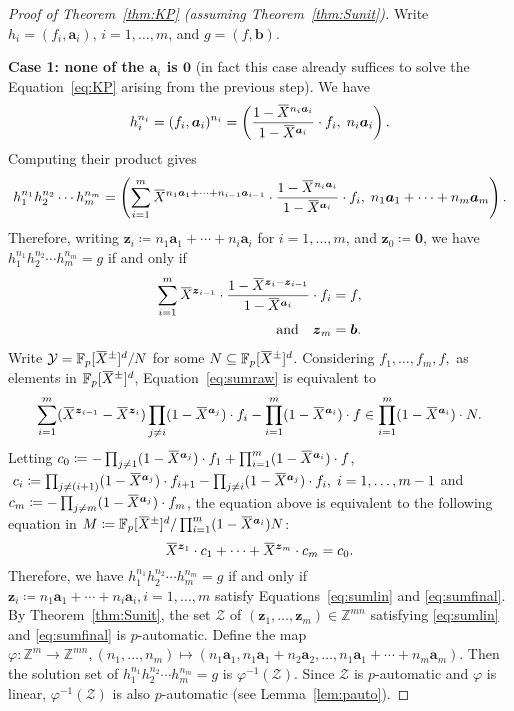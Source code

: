 \documentclass[a4paper,UKenglish,cleveref, autoref, thm-restate]{lipics-v2021}
\newcommand{\Z}{\mathbb{Z}}
\newcommand{\F}{\mathbb{F}}
\newcommand{\mY}{\mathcal{Y}}
\newcommand{\mZ}{\mathcal{Z}}
\newcommand{\ba}{\boldsymbol{a}}
\newcommand{\bb}{\boldsymbol{b}}
\newcommand{\bz}{\boldsymbol{z}}
\newcommand{\bzer}{\boldsymbol{0}}
\newcommand{\oX}{\mkern 1.5mu\overline{\mkern-1.5mu X \mkern-1.5mu}\mkern 1.5mu}
\theoremstyle{definition}
\theoremstyle{definition}
\theoremstyle{definition}
\begin{document}
\thmSunit*

\begin{proof}[Proof of Theorem~\ref{thm:KP} (assuming Theorem~\ref{thm:Sunit})]
    Write $h_i = (f_i, \ba_i), \, i = 1, \ldots, m$, and $g = (f, \bb)$.
    
    \textbf{Case 1: none of the $\ba_i$ is $\bzer$} (in fact this case already suffices to solve the Equation~\eqref{eq:KP} arising from the previous step).
    We have
    \[
    h_i^{n_i} = (f_i, \ba_i)^{n_i} = \left( \frac{1 - \oX^{n_i \ba_i}}{1 - \oX^{\ba_i}} \cdot f_i, \; n_i \ba_i \right).
    \]
    Computing their product gives
    \[
    h_1^{n_1} h_2^{n_2} \cdots h_m^{n_m} = \left( \sum_{i = 1}^m \oX^{n_1 \ba_1 + \cdots + n_{i-1} \ba_{i-1}} \cdot \frac{1 - \oX^{n_i \ba_i}}{1 - \oX^{\ba_i}} \cdot f_i,\; n_1 \ba_1 + \cdots + n_m \ba_m \right).
    \]
    Therefore, writing $\bz_i \coloneqq n_1 \ba_1 + \cdots + n_{i} \ba_{i}$ for $i = 1, \ldots, m$, and $\bz_0 \coloneqq \bzer$, we have $h_1^{n_1} h_2^{n_2} \cdots h_m^{n_m} = g$ if and only if
    \begin{align}
        \sum_{i = 1}^m \oX^{\bz_{i-1}} \cdot \frac{1 - \oX^{\bz_i - \bz_{i-1}}}{1 - \oX^{\ba_i}} \cdot f_i & = f, \label{eq:sumraw} \\
        \text{and} \quad \bz_m & = \bb. \label{eq:sumlin}
    \end{align}    
    Write $\mY = \F_p[\oX^{\pm}]^d/N$ for some $N \subseteq \F_p[\oX^{\pm}]^d$.
    Considering $f_1, \ldots, f_m, f,$ as elements in $\F_p[\oX^{\pm}]^d$, Equation~\eqref{eq:sumraw} is equivalent to
    \[
    \sum_{i = 1}^m (\oX^{\bz_{i-1}} - \oX^{\bz_i}) \prod_{j \neq i} (1 - \oX^{\ba_j}) \cdot f_i - \prod_{i=1}^{m}(1 - \oX^{\ba_i}) \cdot f \in \prod_{i=1}^{m}(1 - \oX^{\ba_i}) \cdot N.
    \]
    Letting $c_0 \coloneqq - \prod_{j \neq 1} (1 - \oX^{\ba_j}) \cdot f_1 + \prod_{i=1}^{m}(1 - \oX^{\ba_i}) \cdot f$, $\; c_i \coloneqq \prod_{j \neq (i+1)} (1 - \oX^{\ba_j}) \cdot f_{i+1} - \prod_{j \neq i} (1 - \oX^{\ba_j}) \cdot f_i, \; i = 1, \ldots, m-1$ and $c_m \coloneqq - \prod_{j \neq m} (1 - \oX^{\ba_j}) \cdot f_m$, the equation above is equivalent to the following equation in $M \coloneqq \F_p[\oX^{\pm}]^d/\prod_{i=1}^{m}(1 - \oX^{\ba_i})N$:
    \begin{equation}\label{eq:sumfinal}
        \oX^{\bz_1} \cdot c_1 + \cdots + \oX^{\bz_m} \cdot c_m = c_0.
    \end{equation}
    Therefore, we have $h_1^{n_1} h_2^{n_2} \cdots h_m^{n_m} = g$ if and only if $\bz_i \coloneqq n_1 \ba_1 + \cdots + n_{i} \ba_{i}, i = 1, \ldots, m$ satisfy Equations~\eqref{eq:sumlin} and \eqref{eq:sumfinal}. By Theorem~\ref{thm:Sunit}, the set $\mZ$ of $(\bz_1, \ldots, \bz_m) \in \Z^{mn}$ satisfying \eqref{eq:sumlin} and \eqref{eq:sumfinal} is $p$-automatic.
    Define the map $\varphi \colon \Z^m \rightarrow \Z^{mn}, (n_1, \ldots, n_m) \mapsto (n_1 \ba_1, n_1 \ba_1 + n_2 \ba_2, \ldots, n_1 \ba_1 + \cdots + n_m \ba_m)$. Then the solution set of $h_1^{n_1} h_2^{n_2} \cdots h_m^{n_m} = g$ is $\varphi^{-1}(\mZ)$. Since $\mZ$ is $p$-automatic and $\varphi$ is linear, $\varphi^{-1}(\mZ)$ is also $p$-automatic (see Lemma~\ref{lem:pauto}).


\end{proof}
\end{document}
